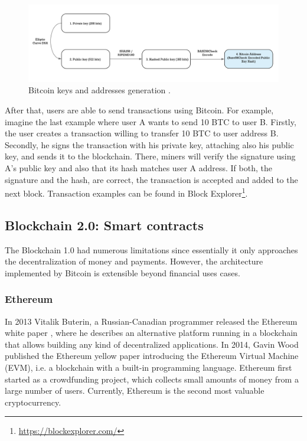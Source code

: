 \begin{figure}[bth]
  \centering
  \includegraphics[width=0.9\linewidth]{gfx/bitkeys}    
  \caption{Bitcoin keys and addresses generation \citep{BitcoinKey2018}.}
  \label{fig:EthereumAccounts}
\end{figure}

After that, users are able to send transactions using Bitcoin. For example, imagine the last example where user A wants to send 10 BTC to user B. Firstly, the user creates a transaction willing to transfer 10 BTC to user address B. Secondly, he signs the transaction with his private key, attaching also his public key, and sends it to the blockchain. There, miners will verify the signature using A's public key and also that its hash matches user A address. If both, the signature and the hash, are correct, the transaction is accepted and added to the next block. Transaction examples can be found in Block Explorer\footnote{\url{https://blockexplorer.com/}}.

\subsection{Blockchain 2.0: Smart contracts} \label{smartContracts}

The Blockchain 1.0 had numerous limitations since essentially it only approaches the decentralization of money and payments. However, the architecture implemented by Bitcoin is extensible beyond financial uses cases.

\subsubsection{Ethereum}

In 2013 Vitalik Buterin, a Russian-Canadian programmer released the Ethereum white paper \cite{buterin2014next}, where he describes an alternative platform running in a blockchain that allows building any kind of decentralized applications. In 2014, Gavin Wood published the Ethereum
yellow paper introducing the Ethereum Virtual Machine (EVM), i.e. a blockchain with a built-in programming language. Ethereum first started as a crowdfunding project, which collects small amounts of money from a large number of users. Currently, Ethereum is the second most valuable cryptocurrency.

